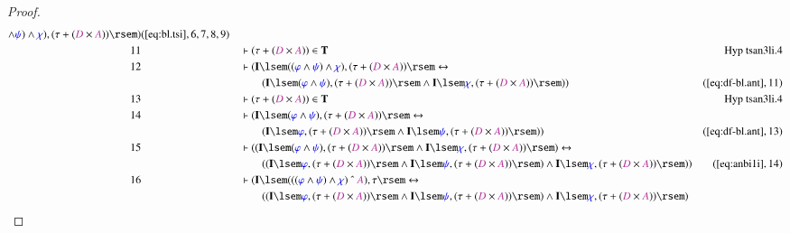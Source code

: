 \begin{proof}
\begin{align}
      \wedge \mw{\psi} ) \wedge \mw{\chi} ) , ( \tau + (
      \mc{D} \times \mc{A} ) ) \rsem
      )&(\mbox{\ref{eq:bl.tsi}},6,7,8,9)\notag
  \\ 11 &&  & \vdash ( \tau + ( \mc{D} \times \mc{A} ) ) \in
      \mathbf{T}&\text{Hyp~tsan3li.4}\notag%
  \\ 12 &&  & \vdash ( \mathbf{I} \lsem ( ( \mw{\varphi} \wedge \mw{\psi} )
      \wedge \mw{\chi} ) , ( \tau + ( \mc{D} \times \mc{A} )
      ) \rsem \leftrightarrow  \notag \\ & & & \qquad
     ( \mathbf{I} \lsem (
      \mw{\varphi} \wedge \mw{\psi} ) , ( \tau + ( \mc{D}
      \times \mc{A} ) ) \rsem \wedge \mathbf{I} \lsem
      \mw{\chi} , ( \tau + ( \mc{D} \times \mc{A} ) ) \rsem
      ) )&(\mbox{\ref{eq:df-bl.ant}},11)\notag
  \\ 13 &&  & \vdash ( \tau + ( \mc{D} \times \mc{A} ) ) \in
      \mathbf{T}&\text{Hyp~tsan3li.4}\notag%
  \\ 14 &&  & \vdash ( \mathbf{I} \lsem ( \mw{\varphi} \wedge \mw{\psi} ) , (
      \tau + ( \mc{D} \times \mc{A} ) ) \rsem
      \leftrightarrow  \notag \\ & & & \qquad
     ( \mathbf{I} \lsem \mw{\varphi} , (
      \tau + ( \mc{D} \times \mc{A} ) ) \rsem \wedge
      \mathbf{I} \lsem \mw{\psi} , ( \tau + ( \mc{D} \times
      \mc{A} ) ) \rsem )
      )&(\mbox{\ref{eq:df-bl.ant}},13)\notag
  \\ 15 &&  & \vdash ( ( \mathbf{I} \lsem ( \mw{\varphi} \wedge \mw{\psi} ) , (
      \tau + ( \mc{D} \times \mc{A} ) ) \rsem \wedge
      \mathbf{I} \lsem \mw{\chi} , ( \tau + ( \mc{D} \times
      \mc{A} ) ) \rsem ) \leftrightarrow  \notag \\ & & & \qquad
     ( ( \mathbf{I}
      \lsem \mw{\varphi} , ( \tau + ( \mc{D} \times \mc{A} )
      ) \rsem \wedge \mathbf{I} \lsem \mw{\psi} , ( \tau +
      ( \mc{D} \times \mc{A} ) ) \rsem ) \wedge \mathbf{I}
      \lsem \mw{\chi} , ( \tau + ( \mc{D} \times \mc{A} ) )
      \rsem ) )&(\mbox{\ref{eq:anbi1i}},14)\notag
  \\ 16 &&  & \vdash ( \mathbf{I} \lsem ( ( ( \mw{\varphi} \wedge \mw{\psi} )
      \wedge \mw{\chi} ) ~\string^~ \mc{A} ) , \tau \rsem
      \leftrightarrow  \notag \\ & & & \qquad
     ( ( \mathbf{I} \lsem \mw{\varphi} , (
      \tau + ( \mc{D} \times \mc{A} ) ) \rsem \wedge
      \mathbf{I} \lsem \mw{\psi} , ( \tau + ( \mc{D} \times
      \mc{A} ) ) \rsem ) \wedge \mathbf{I} \lsem \mw{\chi}
      , ( \tau + ( \mc{D} \times \mc{A} ) ) \rsem )

\end{align}
\end{proof}
